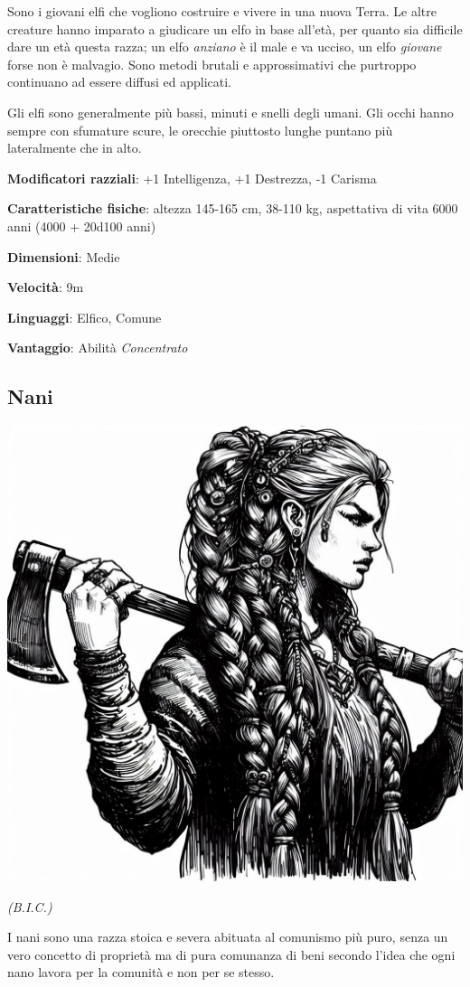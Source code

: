 \begin{multicols}{2}
Sono i giovani elfi che vogliono costruire e vivere in una nuova Terra. Le altre creature hanno imparato a giudicare un elfo in base all'età, per quanto sia difficile dare un età questa razza; un elfo \emph{anziano} è il male e va ucciso, un elfo \emph{giovane} forse non è malvagio.
Sono metodi brutali e approssimativi che purtroppo continuano ad essere diffusi ed applicati.

Gli elfi sono generalmente più bassi, minuti e snelli degli umani. Gli occhi hanno sempre con sfumature scure, le orecchie piuttosto lunghe puntano più lateralmente che in alto.

\textbf{Modificatori razziali}: +1 Intelligenza, +1 Destrezza, -1 Carisma

\textbf{Caratteristiche fisiche}: altezza 145-165 cm, 38-110 kg, aspettativa di vita 6000 anni (4000 + 20d100 anni)

\textbf{Dimensioni}: Medie

\textbf{Velocità}: 9m

\textbf{Linguaggi}: Elfico, Comune

\textbf{Vantaggio}: Abilità \emph{Concentrato}

\subsection{Nani}\label{nani}

\begin{center}
\includegraphics[height=0.7\linewidth]{immagini/nana2-ai.png}

\emph{(B.I.C.)}
\end{center}

I nani sono una razza stoica e severa abituata al comunismo più puro, senza un vero concetto di proprietà ma di pura comunanza di beni secondo l'idea che ogni nano lavora per la comunità e non per se stesso.


\end{multicols}
